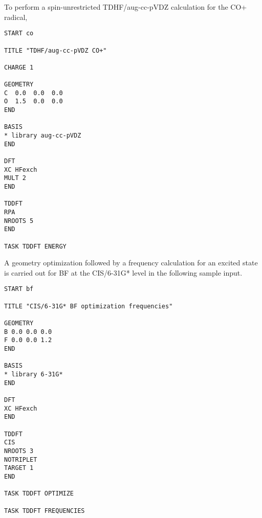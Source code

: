 To perform a spin-unrestricted TDHF/aug-cc-pVDZ calculation for the CO+ radical,
\begin{verbatim}
START co

TITLE "TDHF/aug-cc-pVDZ CO+"

CHARGE 1

GEOMETRY
C  0.0  0.0  0.0
O  1.5  0.0  0.0
END

BASIS
* library aug-cc-pVDZ
END

DFT
XC HFexch
MULT 2
END

TDDFT
RPA
NROOTS 5
END

TASK TDDFT ENERGY
\end{verbatim}

A geometry optimization followed by a frequency calculation for an excited state
is carried out for BF at the CIS/6-31G* level in the following sample input.
\begin{verbatim}
START bf

TITLE "CIS/6-31G* BF optimization frequencies"

GEOMETRY
B 0.0 0.0 0.0
F 0.0 0.0 1.2
END

BASIS
* library 6-31G*
END

DFT
XC HFexch
END

TDDFT
CIS
NROOTS 3
NOTRIPLET
TARGET 1
END

TASK TDDFT OPTIMIZE

TASK TDDFT FREQUENCIES
\end{verbatim}
